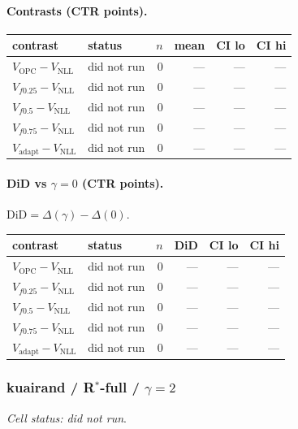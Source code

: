 \documentclass[10pt,a4paper]{article}
\begin{document}
\paragraph{Contrasts (CTR points).}
{\centering\small\begin{tabular}{llrrrr}
\toprule contrast & status & $n$ & mean & CI lo & CI hi \\
\midrule
$V_{\mathrm{OPC}}-V_{\mathrm{NLL}}$ & did not run & 0 & --- & --- & --- \\
$V_{f0.25}-V_{\mathrm{NLL}}$ & did not run & 0 & --- & --- & --- \\
$V_{f0.5}-V_{\mathrm{NLL}}$ & did not run & 0 & --- & --- & --- \\
$V_{f0.75}-V_{\mathrm{NLL}}$ & did not run & 0 & --- & --- & --- \\
$V_{\mathrm{adapt}}-V_{\mathrm{NLL}}$ & did not run & 0 & --- & --- & --- \\
\bottomrule\end{tabular}\par}
\paragraph{DiD vs $\gamma=0$ (CTR points).} $\mathrm{DiD}=\Delta(\gamma)-\Delta(0)$.
{\centering\small\begin{tabular}{llrrrr}
\toprule contrast & status & $n$ & DiD & CI lo & CI hi \\
\midrule
$V_{\mathrm{OPC}}-V_{\mathrm{NLL}}$ & did not run & 0 & --- & --- & --- \\
$V_{f0.25}-V_{\mathrm{NLL}}$ & did not run & 0 & --- & --- & --- \\
$V_{f0.5}-V_{\mathrm{NLL}}$ & did not run & 0 & --- & --- & --- \\
$V_{f0.75}-V_{\mathrm{NLL}}$ & did not run & 0 & --- & --- & --- \\
$V_{\mathrm{adapt}}-V_{\mathrm{NLL}}$ & did not run & 0 & --- & --- & --- \\
\bottomrule\end{tabular}\par}
\bigskip
\subsubsection{kuairand / R$^*$-full / $\gamma=2$}
\emph{Cell status: did not run}.
\end{document}
